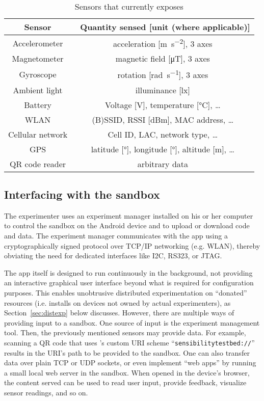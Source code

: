 \begin{table}
\small
\caption{Sensors that \sys currently exposes}\label{tbl:sensors}
\centering
\begin{tabular}{c|c}
\hline
Sensor & Quantity sensed [unit (where applicable)]\\
\hline
\hline
Accelerometer & acceleration [\si{\meter\per\square\second}], 3 axes\\
Magnetometer & magnetic field [\si{\micro\tesla}], 3 axes\\
Gyroscope & rotation [\si{\radian\per\second}], 3 axes\\
Ambient light & illuminance [\si{\lux}]\\
\hline
Battery & Voltage [\si{\volt}], temperature [\si{\degreeCelsius}], \ldots\\
WLAN & (B)SSID, RSSI [\si{dB}m], MAC address, \ldots\\
Cellular network & Cell ID, LAC, network type, \ldots\\
GPS & latitude [\si{\degree}], longitude [\si{\degree}], altitude [\si{\meter}], \ldots\\
\hline
QR code reader & arbitrary data\\
\hline
\end{tabular}
\end{table}


\subsection{Interfacing with the sandbox}
The experimenter uses an experiment manager installed on his 
or her computer to control the sandbox on the Android device and to 
upload or download code and data.
The experiment manager communicates with the app using a 
cryptographically signed protocol over TCP/IP networking (e.g. WLAN), 
thereby obviating the need for dedicated interfaces like I2C, RS323, 
or JTAG.

The \sys app itself is designed to run continuously in the background, 
not providing an interactive graphical user interface beyond what is 
required for configuration purposes. This enables unobtrusive distributed 
experimentation on ``donated'' resources (i.e. installs on devices 
not owned by actual experimenters), as 
Section~\ref{sec:distexp} below discusses. 
However, there are multiple ways of providing input to a sandbox. 
One source of input is the experiment management tool. 
Then, the previously mentioned sensors may provide data. For example, 
scanning a QR code that uses \sys's custom URI scheme 
``\texttt{sensibilitytestbed://}'' results in the URI's path to 
be provided to the sandbox.
One can also transfer data over plain 
TCP or UDP sockets, or even implement ``web apps'' by 
running a small local web server in the sandbox. 
When opened in the device's browser, the content served can be used to 
read user input, provide feedback, visualize sensor readings, and so on.

